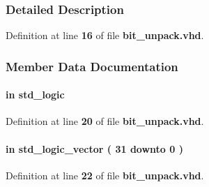 \subsubsection{Detailed Description}


Definition at line {\bf 16} of file {\bf bit\+\_\+unpack.\+vhd}.



\subsubsection{Member Data Documentation}
\paragraph[{clk}]{ {\bfseries \textcolor{keywordflow}{in}\textcolor{vhdlchar}{ }} {\bfseries \textcolor{comment}{std\+\_\+logic}\textcolor{vhdlchar}{ }} \hspace{0.3cm}{\ttfamily [Port]}}\label{classbit__unpack_a4a4609c199d30b3adebbeb3a01276ec5}


Definition at line {\bf 20} of file {\bf bit\+\_\+unpack.\+vhd}.

\paragraph[{data\+\_\+in}]{ {\bfseries \textcolor{keywordflow}{in}\textcolor{vhdlchar}{ }} {\bfseries \textcolor{comment}{std\+\_\+logic\+\_\+vector}\textcolor{vhdlchar}{ }\textcolor{vhdlchar}{(}\textcolor{vhdlchar}{ }\textcolor{vhdlchar}{ } \textcolor{vhdldigit}{31} \textcolor{vhdlchar}{ }\textcolor{keywordflow}{downto}\textcolor{vhdlchar}{ }\textcolor{vhdlchar}{ } \textcolor{vhdldigit}{0} \textcolor{vhdlchar}{ }\textcolor{vhdlchar}{)}\textcolor{vhdlchar}{ }} \hspace{0.3cm}{\ttfamily [Port]}}\label{classbit__unpack_a0b04c68fbc361c8e2abae6c9d2c404d2}


Definition at line {\bf 22} of file {\bf bit\+\_\+unpack.\+vhd}.


